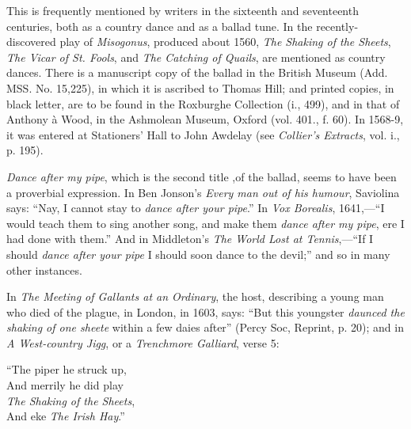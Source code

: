 
This is frequently mentioned by writers in the sixteenth and seventeenth centuries, 
both as a country dance and as a ballad tune. In the recently-discovered
play of \textit{Misogonus}, produced about 1560, \textit{The Shaking of the Sheets}, \textit{The Vicar
of St. Fools}, and \textit{The Catching of Quails}, are mentioned as country dances.
There is a manuscript copy of the ballad in the British Museum (Add. MSS.
No. 15,225), in which it is ascribed to Thomas Hill; and printed copies, in black
letter, are to be found in the Roxburghe Collection (i., 499), and in that of
Anthony à Wood, in the Ashmolean Museum, Oxford (vol. 401., f. 60). In
1568-9, it was entered at Stationers’ Hall to John Awdelay (see \textit{Collier’s
Extracts}, vol. i., p. 195).

\textit{Dance after my pipe}, which is the second title ,of the ballad, seems to have
been a proverbial expression. In Ben Jonson’s \textit{Every man out of his humour},
Saviolina says: “Nay, I cannot stay to \textit{dance after your pipe}.” In \textit{Vox Borealis},
1641,—“I would teach them to sing another song, and make them \textit{dance after
my pipe}, ere I had done with them.” And in Middleton’s \textit{The World Lost at
Tennis},—“If I should \textit{dance after your pipe} I should soon dance to the devil;”
and so in many other instances.

In \textit{The Meeting of Gallants at an Ordinary}, the host, describing a young man
who died of the plague, in London, in 1603, says: “But this youngster \textit{daunced
the shaking of one sheete} within a few daies after” (Percy Soc, Reprint, p. 20);
and in \textit{A West-country Jigg}, or a \textit{Trenchmore Galliard}, verse 5:

\settowidth{\versewidth}{“The piper he struck up,}
\begin{scverse}
\begin{altverse}
“The piper he struck up,\\
And merrily he did play\\
\textit{The Shaking of the Sheets},\\
And eke \textit{The Irish Hay}.”
\end{altverse}
\end{scverse}

